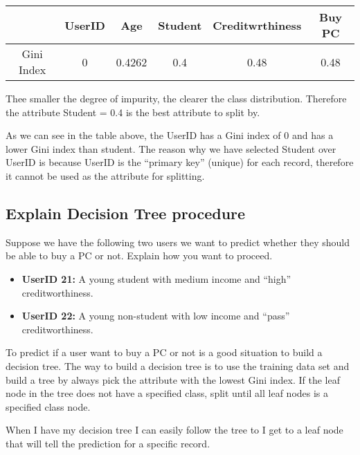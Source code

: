 		\begin{table}[H]
			\begin{tabular}{ c | c | c | c | c | c }
				 & UserID & Age & Student & Creditwrthiness & Buy PC \\ \hline
				Gini Index & 0 & 0.4262 & 0.4 & 0.48 & 0.48 \\ 
			\end{tabular}
		\end{table}

		Thee smaller the degree of impurity, the clearer the class distribution. 
		Therefore the attribute Student = 0.4 is the best attribute to split by.

		As we can see in the table above, the UserID has a Gini index of 0 and has 
		a lower Gini index than student. The reason why we have selected Student over
		UserID is because UserID is the “primary key” (unique) for each 
		record, therefore it cannot be used as the attribute for splitting.


		\clearpage
		\subsection*{Explain Decision Tree procedure}

		Suppose we have the following two users we want to predict whether they
		should be able to buy a PC or not. Explain how you want to proceed.
		
		\begin{itemize}
			\item {\bf UserID 21:} A young student with medium income and “high” 
			creditworthiness.
			\item {\bf UserID 22:} A young non-student with low income and “pass” 
			creditworthiness.
		\end{itemize}

		To predict if a user want to buy a PC or not is a good situation to build a
		decision tree. The way to build a decision tree is to use the training data
		set and build a tree by always pick the attribute with the lowest Gini index.
		If the leaf node in the tree does not have a specified class, split until
		all leaf nodes is a specified class node. 

		When I have my decision tree I can easily follow the tree to I get to a leaf
		node that will tell the prediction for a specific record.
